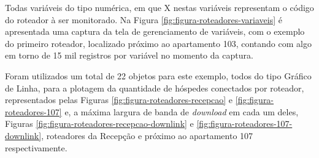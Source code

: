 Todas variáveis do tipo numérica, em que X nestas variáveis representam o código do roteador à ser monitorado. Na Figura \ref{fig:figura-roteadores-variaveis} é apresentada uma captura da tela de gerenciamento de variáveis, com o exemplo do primeiro roteador, localizado próximo ao apartamento 103, contando com algo em torno de 15 mil registros por variável no momento da captura.

        \begin{figure}[!h]
    	\end{figure}
    	
        \begin{figure}[!h]
    	\end{figure}
    	
Foram utilizados um total de 22 objetos para este exemplo, todos do tipo Gráfico de Linha, para a plotagem da quantidade de hóspedes conectados por roteador, representados pelas Figuras \ref{fig:figura-roteadores-recepcao} e \ref{fig:figura-roteadores-107} e, a máxima largura de banda de \textit{download} em cada um deles, Figuras \ref{fig:figura-roteadores-recepcao-downlink} e \ref{fig:figura-roteadores-107-downlink}, roteadores da Recepção e próximo ao apartamento 107 respectivamente.

